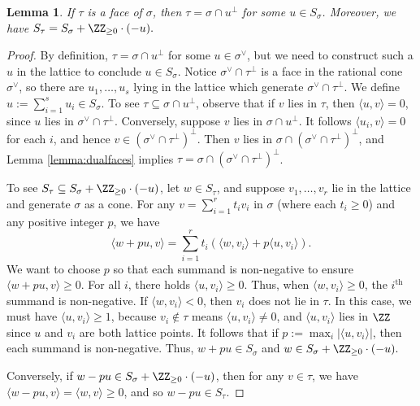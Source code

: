 \documentclass[12pt]{amsart}
\theoremstyle{plain}
\newtheorem{lemma}[theorem]{Lemma}
\begin{document}
\begin{lemma}
If $\tau$ is a face of $\sigma$, then $\tau = \sigma \cap u^\perp$ for some $u \in S_\sigma$.
Moreover, we have $S_\tau =S_\sigma + \ZZ_{\ge 0} \cdot (-u).$
\end{lemma}
\begin{proof}
By definition, $\tau = \sigma \cap u^\perp$ for some $u \in \sigma^\vee$, but we need to construct such a $u$ in the lattice to conclude $u \in S_\sigma$.
Notice $\sigma^\vee \cap \tau^\perp$ is a face in the rational cone $\sigma^\vee$, so there are $u_1, \ldots, u_s$ lying in the lattice which generate $\sigma^\vee \cap \tau^\perp$.
We define $u := \sum_{i=1}^s u_i \in S_\sigma$.
To see $\tau \subseteq \sigma \cap u^\perp$, observe that if $v$ lies in $\tau$, then $\langle u, v\rangle = 0$, since $u$ lies in $\sigma^\vee \cap \tau^\perp$.
Conversely, suppose $v$ lies in $\sigma \cap u^\perp$.
It follows $\langle u_i, v \rangle = 0$ for each $i$, and hence $v \in (\sigma^\vee \cap \tau^\perp)^\perp$.
Then $v$ lies in $\sigma \cap (\sigma^\vee \cap \tau^\perp)^\perp$, and Lemma \ref{lemma:dualfaces} implies  $\tau = \sigma \cap (\sigma^\vee \cap \tau^\perp)^\perp$.

To see $S_\tau \subseteq S_\sigma + \ZZ_{\ge 0} \cdot (-u)$, let $w \in S_\tau$, and suppose $v_1, \ldots, v_r$ lie in the lattice and generate $\sigma$ as a cone.
For any $v = \sum_{i=1}^r t_i v_i$ in $\sigma$ (where each $t_i \ge 0$) and any positive integer $p$, we have
$$\langle w + pu, v\rangle = \sum_{i=1}^r t_i \left( \langle w, v_i \rangle + p \langle u, v_i \rangle \right).$$
We want to choose $p$ so that each summand is non-negative to ensure $\langle w+pu, v \rangle \ge 0$.
For all $i$, there holds $\langle u, v_i \rangle \ge 0$.
Thus, when $\langle w, v_i \rangle \ge 0$, the $i^\text{th}$ summand is non-negative.
If $\langle w, v_i\rangle < 0$, then $v_i$ does not lie in $\tau$.
In this case, we must have $\langle u, v_i\rangle \ge 1$, because $v_i \notin \tau$ means $\langle u, v_i \rangle \ne 0$, and $\langle u, v_i \rangle$ lies in $\ZZ$ since $u$ and $v_i$ are both lattice points.
It follows that if $p := \max_i |\langle u, v_i\rangle|$, then each summand is non-negative.
Thus, $w + pu \in S_\sigma$ and $w \in S_\sigma + \ZZ_{\ge 0} \cdot (-u).$

Conversely, if $w - pu \in S_\sigma + \ZZ_{\ge 0} \cdot (-u)$, then for any $v \in \tau$, we have $\langle w - pu, v\rangle = \langle w, v \rangle \ge 0$, and so $w - pu \in S_\tau$.
\end{proof}
\end{document}
